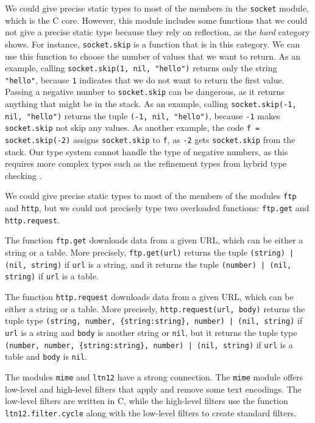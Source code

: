 We could give precise static types to most of the members
in the \texttt{socket} module, which is the C core.
However, this module includes some functions that
we could not give a precise static type because they
rely on reflection, as the \emph{hard} category shows.
For instance, \texttt{socket.skip} is a function that is
in this category.
We can use this function to choose the number of
values that we want to return.
As an example, calling \texttt{socket.skip(1, nil, "hello")}
returns only the string \texttt{"hello"}, because \texttt{1} indicates
that we do not want to return the first value.
Passing a negative number to \texttt{socket.skip} can be
dangerous, as it returns anything that might be in the stack.
As an example, calling \texttt{socket.skip(-1, nil, "hello")}
returns the tuple \texttt{(-1, nil, "hello")}, because \texttt{-1} makes
\texttt{socket.skip} not skip any values.
As another example, the code \texttt{f = socket.skip(-2)} assigns \texttt{socket.skip}
to \texttt{f}, as \texttt{-2} gets \texttt{socket.skip} from the stack.
Our type system cannot handle the type of negative numbers, as
this requires more complex types such as the refinement types from
hybrid type checking \cite{flanagan2006htc}.

We could give precise static types to most of the members of the
modules \texttt{ftp} and \texttt{http}, but we could not precisely type
two overloaded functions: \texttt{ftp.get} and \texttt{http.request}.

The function \texttt{ftp.get} downloads data from a given URL,
which can be either a string or a table.
More precisely, \texttt{ftp.get(url)} returns the tuple
\texttt{(string) | (nil, string)} if \texttt{url} is a string,
and it returns the tuple \texttt{(number) | (nil, string)} if
\texttt{url} is a table.

The function \texttt{http.request} downloads data from a given URL,
which can be either a string or a table.
More precisely, \texttt{http.request(url, body)} returns the tuple type
\texttt{(string, number, \{string:string\}, number) | (nil, string)}
if \texttt{url} is a string and \texttt{body} is another string or \texttt{nil},
but it returns the tuple type
\texttt{(number, number, \{string:string\}, number) | (nil, string)}
if \texttt{url} is a table and \texttt{body} is \texttt{nil}.

The modules \texttt{mime} and \texttt{ltn12} have a strong connection.
The \texttt{mime} module offers low-level and high-level filters
that apply and remove some text encodings.
The low-level filters are written in C, while the high-level filters
use the function \texttt{ltn12.filter.cycle} along with the low-level
filters to create standard filters.

